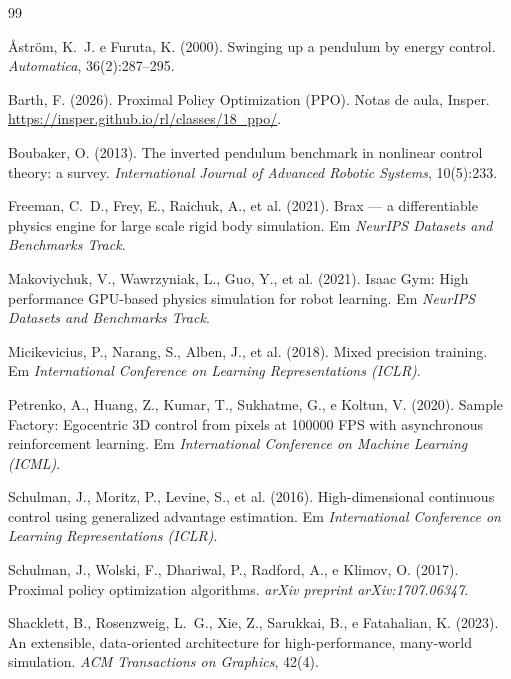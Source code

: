 \documentclass[12pt]{article}
\begin{document}
\begin{thebibliography}{99}
\scriptsize
\setlength{\itemsep}{0pt}
\setlength{\parskip}{0pt}

Åström, K.~J. e Furuta, K. (2000).
Swinging up a pendulum by energy control.
\emph{Automatica}, 36(2):287--295.

Barth, F. (2026).
Proximal Policy Optimization (PPO). Notas de aula, Insper.
\url{https://insper.github.io/rl/classes/18_ppo/}.

Boubaker, O. (2013).
The inverted pendulum benchmark in nonlinear control theory: a survey.
\emph{International Journal of Advanced Robotic Systems}, 10(5):233.

Freeman, C.~D., Frey, E., Raichuk, A., et al. (2021).
Brax --- a differentiable physics engine for large scale rigid body
simulation.
Em \emph{NeurIPS Datasets and Benchmarks Track}.

Makoviychuk, V., Wawrzyniak, L., Guo, Y., et al. (2021).
Isaac Gym: High performance GPU-based physics simulation for robot learning.
Em \emph{NeurIPS Datasets and Benchmarks Track}.

Micikevicius, P., Narang, S., Alben, J., et al. (2018).
Mixed precision training.
Em \emph{International Conference on Learning Representations (ICLR)}.

Petrenko, A., Huang, Z., Kumar, T., Sukhatme, G., e Koltun, V. (2020).
Sample Factory: Egocentric 3D control from pixels at 100000 FPS with
asynchronous reinforcement learning.
Em \emph{International Conference on Machine Learning (ICML)}.

Schulman, J., Moritz, P., Levine, S., et al. (2016).
High-dimensional continuous control using generalized advantage estimation.
Em \emph{International Conference on Learning Representations (ICLR)}.

Schulman, J., Wolski, F., Dhariwal, P., Radford, A., e Klimov, O. (2017).
Proximal policy optimization algorithms.
\emph{arXiv preprint arXiv:1707.06347}.

Shacklett, B., Rosenzweig, L.~G., Xie, Z., Sarukkai, B., e Fatahalian, K.
(2023).
An extensible, data-oriented architecture for high-performance, many-world
simulation.
\emph{ACM Transactions on Graphics}, 42(4).


\end{thebibliography}
\end{document}

